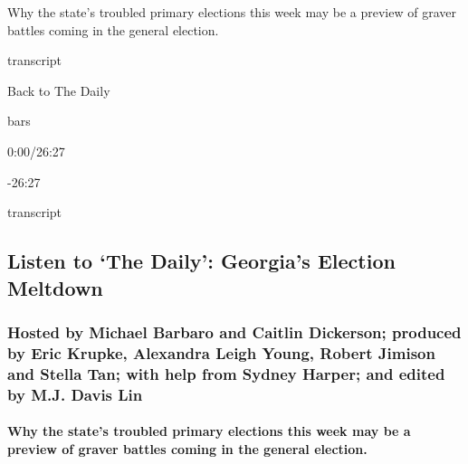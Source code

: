 Why the state's troubled primary elections this week may be a preview of
graver battles coming in the general election.

transcript

Back to The Daily

bars

0:00/26:27

-26:27

transcript

\hypertarget{listen-to-the-daily-georgias-election-meltdown-1}{%
\subsection{Listen to `The Daily': Georgia's Election
Meltdown}\label{listen-to-the-daily-georgias-election-meltdown-1}}

\hypertarget{hosted-by-michael-barbaro-and-caitlin-dickerson-produced-by-eric-krupke-alexandra-leigh-young-robert-jimison-and-stella-tan-with-help-from-sydney-harper-and-edited-by-mj-davis-lin}{%
\subsubsection{Hosted by Michael Barbaro and Caitlin Dickerson; produced
by Eric Krupke, Alexandra Leigh Young, Robert Jimison and Stella Tan;
with help from Sydney Harper; and edited by M.J. Davis
Lin}\label{hosted-by-michael-barbaro-and-caitlin-dickerson-produced-by-eric-krupke-alexandra-leigh-young-robert-jimison-and-stella-tan-with-help-from-sydney-harper-and-edited-by-mj-davis-lin}}

\hypertarget{why-the-states-troubled-primary-elections-this-week-may-be-a-preview-of-graver-battles-coming-in-the-general-election}{%
\paragraph{Why the state's troubled primary elections this week may be a
preview of graver battles coming in the general
election.}\label{why-the-states-troubled-primary-elections-this-week-may-be-a-preview-of-graver-battles-coming-in-the-general-election}}

